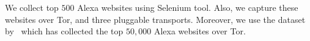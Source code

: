 We collect top $500$ Alexa websites using Selenium tool. Also, we capture these websites over Tor, and three pluggable transports. Moreover, we use 
the dataset by~\cite{deepcore} which has collected the top $50,000$ Alexa websites over Tor. 

